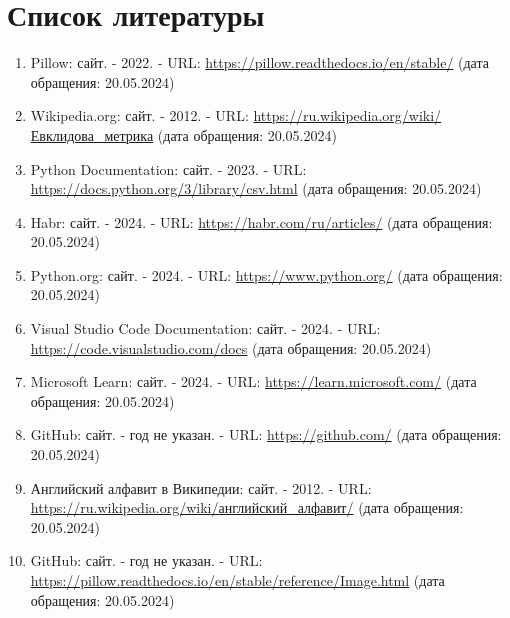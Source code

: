 \documentclass[14pt]{extreport}
\begin{document}
\chapter*{Список литературы}
\begin{enumerate}
    \item Pillow: сайт. - 2022. - URL: \url{https://pillow.readthedocs.io/en/stable/} (дата обращения: 20.05.2024)
    \item Wikipedia.org: сайт. - 2012. - URL: \url{https://ru.wikipedia.org/wiki/Евклидова_метрика} (дата обращения: 20.05.2024)
    \item Python Documentation: сайт. - 2023. - URL: \url{https://docs.python.org/3/library/csv.html} (дата обращения: 20.05.2024)
    \item Habr: сайт. - 2024. - URL: \url{https://habr.com/ru/articles/} (дата обращения: 20.05.2024)
    \item Python.org: сайт. - 2024. - URL: \url{https://www.python.org/} (дата обращения: 20.05.2024)
    \item Visual Studio Code Documentation: сайт. - 2024. - URL: \url{https://code.visualstudio.com/docs} (дата обращения: 20.05.2024)
    \item Microsoft Learn: сайт. - 2024. - URL: \url{https://learn.microsoft.com/} (дата обращения: 20.05.2024)
    \item GitHub: сайт. - год не указан. - URL: \url{https://github.com/} (дата обращения: 20.05.2024)
    \item Английский алфавит в Википедии: сайт. - 2012. - URL: \url{https://ru.wikipedia.org/wiki/английский_алфавит/} (дата обращения: 20.05.2024)
    \item GitHub: сайт. - год не указан. - URL: \url{https://pillow.readthedocs.io/en/stable/reference/Image.html} (дата обращения: 20.05.2024)
\end{enumerate}
\end{document}
